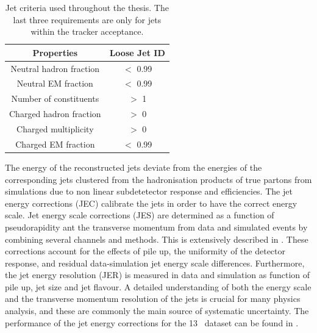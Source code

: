\begin{table}[h]
	\centering
	\caption{Jet criteria used throughout the thesis. The last three requirements are only for jets within the tracker acceptance.}
	\begin{tabular}{cc}
		\toprule 
		Properties & Loose Jet ID \\ 
		\midrule
		Neutral hadron fraction & $<$ 0.99 \\ 
		
		Neutral EM fraction & $<$ 0.99 \\ 
		
		Number of constituents & $>$ 1 \\ 
		 		
		Charged hadron fraction & $>$ 0 \\ 
	 
		Charged multiplicity & $>$ 0 \\ 
		
		Charged EM fraction & $<$ 0.99 \\ 
		\bottomrule
	\end{tabular} 
	\label{tab:jetID}
\end{table}

The energy of the reconstructed jets deviate from the energies of the corresponding jets clustered from the hadronisation products of true partons from simulations due to non linear subdetetector response and efficiencies. The jet energy corrections (JEC) calibrate the jets in order to have the correct energy scale.
Jet energy scale corrections (JES) are determined as a function of pseudorapidity ant the transverse momentum from data and simulated events by combining several channels and methods. This is extensively described in \cite{1748-0221-12-02-P02014}. These corrections account for the effects of pile up, the uniformity of the detector response, and residual data-simulation jet energy scale differences. Furthermore, the jet energy resolution (JER) is measured in data and simulation as function of pile up, jet size and jet flavour.  A detailed understanding of both the energy scale and the transverse momentum resolution of the jets is crucial for many physics analysis, and these are commonly the main source of systematic uncertainty. The performance of the jet energy corrections for the 13 \TeV\ dataset can be found in \cite{CMS-DP-2016-020}.


